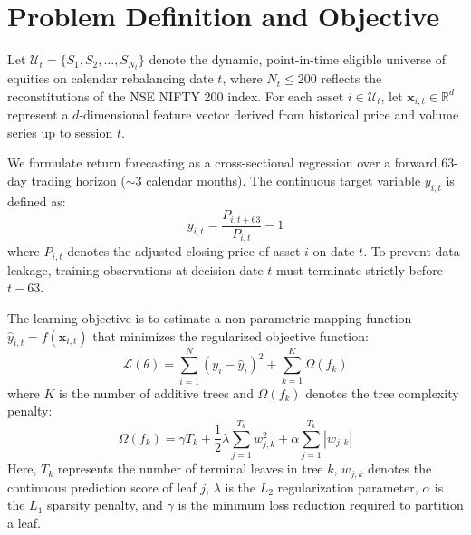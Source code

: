 \section{Problem Definition and Objective}
\label{sec:problem_definition}
Let $\mathcal{U}_t = \{S_1, S_2, \dots, S_{N_t}\}$ denote the dynamic, point-in-time eligible universe of equities on calendar rebalancing date $t$, where $N_t \le 200$ reflects the reconstitutions of the NSE NIFTY 200 index. For each asset $i \in \mathcal{U}_t$, let $\mathbf{x}_{i,t} \in \mathbb{R}^d$ represent a $d$-dimensional feature vector derived from historical price and volume series up to session $t$.

We formulate return forecasting as a cross-sectional regression over a forward 63-day trading horizon ($\sim$3 calendar months). The continuous target variable $y_{i,t}$ is defined as:
\begin{equation}
    y_{i,t} = \frac{P_{i, t+63}}{P_{i,t}} - 1
    \label{eq:target_definition}
\end{equation}
where $P_{i,t}$ denotes the adjusted closing price of asset $i$ on date $t$. To prevent data leakage, training observations at decision date $t$ must terminate strictly before $t - 63$.

The learning objective is to estimate a non-parametric mapping function $\hat{y}_{i,t} = f(\mathbf{x}_{i,t})$ that minimizes the regularized objective function:
\begin{equation}
    \mathcal{L}(\theta) = \sum_{i=1}^N \left( y_i - \hat{y}_i \right)^2 + \sum_{k=1}^K \Omega(f_k)
    \label{eq:objective_func}
\end{equation}
where $K$ is the number of additive trees and $\Omega(f_k)$ denotes the tree complexity penalty:
\begin{equation}
    \Omega(f_k) = \gamma T_k + \frac{1}{2} \lambda \sum_{j=1}^{T_k} w_{j,k}^2 + \alpha \sum_{j=1}^{T_k} |w_{j,k}|
    \label{eq:complexity_penalty}
\end{equation}
Here, $T_k$ represents the number of terminal leaves in tree $k$, $w_{j,k}$ denotes the continuous prediction score of leaf $j$, $\lambda$ is the $L_2$ regularization parameter, $\alpha$ is the $L_1$ sparsity penalty, and $\gamma$ is the minimum loss reduction required to partition a leaf.

